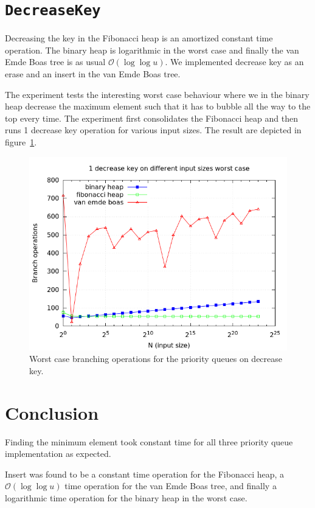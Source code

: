 \documentclass[a4paper,oneside,article,11pt]{memoir}
\begin{document}
\section{\texttt{DecreaseKey}}
Decreasing the key in the Fibonacci heap is an amortized constant time operation. The binary heap is logarithmic in the worst case and finally the van Emde Boas tree is as usual $\mathcal{O}(\log\log u)$. We implemented decrease key as an erase and an insert in the van Emde Boas tree.

The experiment tests the interesting worst case behaviour where we in the binary heap decrease the maximum element such that it has to bubble all the way to the top every time. The experiment first consolidates the Fibonacci heap and then runs 1 decrease key operation for various input sizes. The result are depicted in figure~\ref{fig:dk_worst_1}.

\begin{figure}[H]
\includegraphics[scale=0.5]{../res2/dk/dk_worst_1.png}
\caption{Worst case branching operations for the priority queues on decrease key.}
\label{fig:dk_worst_1}
\end{figure}


\section{Conclusion}
Finding the minimum element took constant time for all three priority queue implementation as expected.

Insert was found to be a constant time operation for the Fibonacci heap, a $\mathcal{O}(\log\log u)$ time operation for the van Emde Boas tree, and finally a logarithmic time operation for the binary heap in the worst case.
\end{document}
